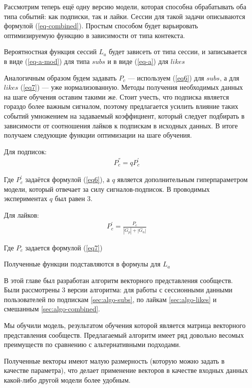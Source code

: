 \documentclass[times,specification,annotation]{itmo-student-thesis}
\begin{document}
Рассмотрим теперь ещё одну версию модели, которая способна обрабатывать оба типа событий: как подписки, так и лайки. Сессии для такой задачи описываются формулой (\ref{eq-combined}). Простым способом будет варьировать оптимизируемую функцию в зависимости от типа контекста. 

Вероятностная функция сессий $L_a$ будет зависеть от типа сессии, и записывается в виде (\ref{eq-a-mod}) для типа $subs$ и в виде (\ref{eq-a}) для $likes$

Аналогичным образом будем задавать $P_c$ --- используем (\ref{eq6}) для $subs$, а для $likes$ (\ref{eq7}) --- уже нормализованную. Методы получения необходимых данных на шаге обучения оставим такими же. Стоит учесть, что подписка является гораздо более важным сигналом, поэтому предлагается усилить влияние таких событий умножением на задаваемый коэффициент, который следует подбирать в зависимости от соотношения лайков к подпискам в исходных данных. В итоге получаем следующие функции оптимизации на шаге обучения.

Для подписок:
\begin{align*}
P^{''}_c = qP^{'}_c
\end{align*}

Где $P^{'}_c$ задаётся формулой  (\ref{eq6}), а $q$ является дополнительным гиперпараметром модели, который отвечает за силу сигналов-подписок. В проводимых экспериментах $q$ был равен 3.

Для лайков:
\begin{align*}
P^{'}_c = \frac{P_c}{|G_p| +|G_n|} 
\end{align*}

Где $P_c$ задается формулой  (\ref{eq7})

Полученные функции подставляются в формулы для $L_a$

\chapterconclusion

В этой главе был разработан алгоритм векторного представления сообществ. Были рассмотрены 3 версии алгоритма: для работы с сессионными данными пользователей по подпискам \ref{sec:algo-subs}, по лайкам \ref{sec:algo-likes} и смешанным \ref{sec:algo-combined}.

Мы обучили модель, результатом обучения которой является матрица векторного
представления сообществ. Предлагаемый алгоритм имеет ряд довольно весомых
преимуществ по сравнению с альтернативными подходами. 

Полученные векторы
имеют малую размерность (которую можно задать в качестве параметра), что
делает применение векторов в качестве входных данных какой-либо другой
модели более удобным. 
\end{document}
